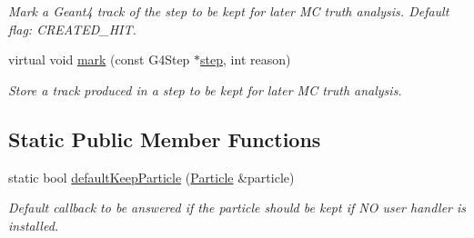 \begin{DoxyCompactItemize}
\begin{DoxyCompactList}\small\item\em Mark a Geant4 track of the step to be kept for later MC truth analysis. Default flag\+: C\+R\+E\+A\+T\+E\+D\+\_\+\+H\+IT. \end{DoxyCompactList}\item 
virtual void \hyperlink{class_d_d4hep_1_1_simulation_1_1_geant4_particle_handler_a7a351cfb66cc4e50b9f184b2e80855f4}{mark} (const G4\+Step $\ast$\hyperlink{class_d_d4hep_1_1_simulation_1_1_geant4_particle_handler_abb534226cfb8d022077d48681226a179}{step}, int reason)
\begin{DoxyCompactList}\small\item\em Store a track produced in a step to be kept for later MC truth analysis. \end{DoxyCompactList}\end{DoxyCompactItemize}
\subsection*{Static Public Member Functions}
\begin{DoxyCompactItemize}
\item 
static bool \hyperlink{class_d_d4hep_1_1_simulation_1_1_geant4_particle_handler_a1d0fdcaf979ddb882519706a3963f54f}{default\+Keep\+Particle} (\hyperlink{class_d_d4hep_1_1_simulation_1_1_geant4_particle_handler_a69214f487c50f6fd550571f37e715117}{Particle} \&particle)
\begin{DoxyCompactList}\small\item\em Default callback to be answered if the particle should be kept if NO user handler is installed. \end{DoxyCompactList}\end{DoxyCompactItemize}
